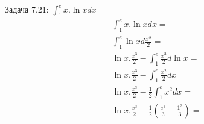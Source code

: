 \documentclass[a4paper, 20pt, fleqn, border=2pt]{article}
\begin{document}
\begin{enumerate}
Задача 7.21: $\int_1^{e} x.\ln{x}dx$
\begin{equation}
\begin{split}
    \int_1^{e} x.\ln{x}dx = \\
    \int_1^{e} \ln{x}d\frac{x^3}{2} = \\
    \ln{x}.\frac{x^3}{2} - \int_1^{e} \frac{x^3}{2}d\ln{x} = \\
    \ln{x}.\frac{x^3}{2} - \int_1^{e} \frac{x^2}{2}dx = \\
    \ln{x}.\frac{x^3}{2} - \frac{1}{2}\int_1^{e} x^2dx = \\
    \ln{x}.\frac{x^3}{2} - \frac{1}{2}(\frac{e^3}{3} - \frac{1^3}{3}) = 
\end{split}
\end{equation}

\end{enumerate}
\end{document}
